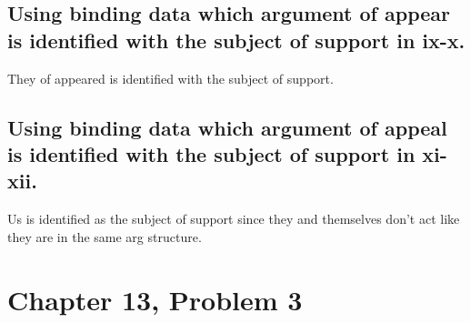 \documentclass{article}
\begin{document}
\subsection{Using binding data which argument of appear is identified with the subject of support in ix-x.}
They of appeared is identified with the subject of support. 
\subsection{Using binding data which argument of appeal is identified with the subject of support in xi-xii.}
Us is identified as the subject of support since they and themselves don't act like they are in the same arg structure.
\section{Chapter 13, Problem 3}
\end{document}
